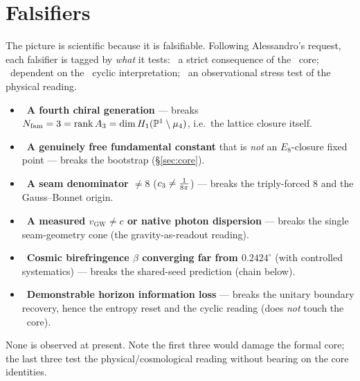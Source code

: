 \section{Falsifiers}\label{sec:falsify}
The picture is scientific because it is falsifiable. Following Alessandro's request, each falsifier is
tagged by \emph{what} it tests: \fcore\ a strict consequence of the \mE\ core; \fcyc\ dependent on the
\mC\ cyclic interpretation; \fobs\ an observational stress test of the physical reading.

\begin{itemize}[leftmargin=1.4em]
\item \fcore\ \textbf{A fourth chiral generation} --- breaks $N_{\mathrm{fam}}=3=\operatorname{rank}A_3=\dim H_1(\mathbb P^1\setminus\mu_4)$, i.e.\ the lattice closure itself.
\item \fcore\ \textbf{A genuinely free fundamental constant} that is \emph{not} an $E_8$-closure fixed point --- breaks the bootstrap (\S\ref{sec:core}).
\item \fcore\ \textbf{A seam denominator $\neq8$} ($c_3\neq\tfrac1{8\pi}$) --- breaks the triply-forced $8$ and the Gauss--Bonnet origin.
\item \fobs\ \textbf{A measured $v_{\mathrm{GW}}\neq c$ or native photon dispersion} --- breaks the single seam-geometry cone (the gravity-as-readout reading).
\item \fobs\ \textbf{Cosmic birefringence $\beta$ converging far from $0.2424^\circ$} (with controlled systematics) --- breaks the shared-seed prediction (chain below).
\item \fcyc\ \textbf{Demonstrable horizon information loss} --- breaks the unitary boundary recovery, hence the entropy reset and the cyclic reading (does \emph{not} touch the \mE\ core).
\end{itemize}
None is observed at present. Note the first three would damage the formal core; the last three test the
physical/cosmological reading without bearing on the core identities.

